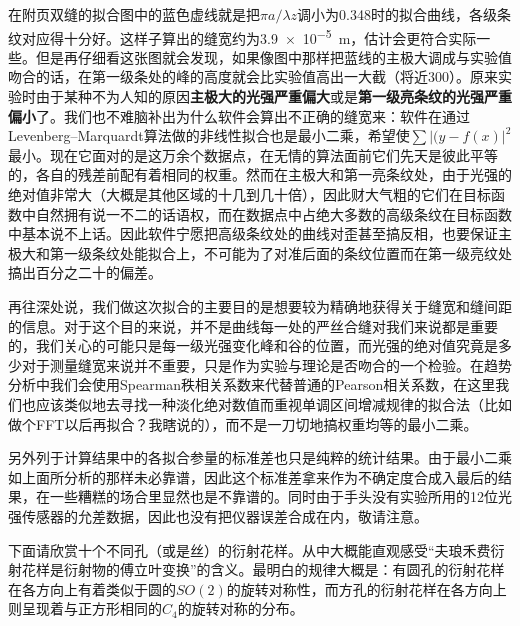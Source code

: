 \documentclass[UTF8]{ctexart}
\begin{document}
在附页双缝的拟合图中的蓝色虚线就是把$\pi a/\lambda z$调小为0.348时的拟合曲线，各级条纹对应得十分好。这样子算出的缝宽约为\SI{3.9e-5}{\m}，估计会更符合实际一些。但是再仔细看这张图就会发现，如果像图中那样把蓝线的主极大调成与实验值吻合的话，在第一级条处的峰的高度就会比实验值高出一大截（将近300）。原来实验时由于某种不为人知的原因\textbf{主极大的光强严重偏大}或是\textbf{第一级亮条纹的光强严重偏小}了。我们也不难脑补出为什么软件会算出不正确的缝宽来：软件在通过Levenberg–Marquardt算法做的非线性拟合也是最小二乘，希望使$\sum\lvert(y-f(x)\rvert^2$最小。现在它面对的是这万余个数据点，在无情的算法面前它们先天是彼此平等的，各自的残差前配有着相同的权重。然而在主极大和第一亮条纹处，由于光强的绝对值非常大（大概是其他区域的十几到几十倍），因此财大气粗的它们在目标函数中自然拥有说一不二的话语权，而在数据点中占绝大多数的高级条纹在目标函数中基本说不上话。因此软件宁愿把高级条纹处的曲线对歪甚至搞反相，也要保证主极大和第一级条纹处能拟合上，不可能为了对准后面的条纹位置而在第一级亮纹处搞出百分之二十的偏差。

再往深处说，我们做这次拟合的主要目的是想要较为精确地获得关于缝宽和缝间距的信息。对于这个目的来说，并不是曲线每一处的严丝合缝对我们来说都是重要的，我们关心的可能只是每一级光强变化峰和谷的位置，而光强的绝对值究竟是多少对于测量缝宽来说并不重要，只是作为实验与理论是否吻合的一个检验。在趋势分析中我们会使用Spearman秩相关系数来代替普通的Pearson相关系数，在这里我们也应该类似地去寻找一种淡化绝对数值而重视单调区间增减规律的拟合法（比如做个FFT以后再拟合？我瞎说的），而不是一刀切地搞权重均等的最小二乘。

另外列于计算结果中的各拟合参量的标准差也只是纯粹的统计结果。由于最小二乘如上面所分析的那样未必靠谱，因此这个标准差拿来作为不确定度合成入最后的结果，在一些糟糕的场合里显然也是不靠谱的。同时由于手头没有实验所用的12位光强传感器的允差数据，因此也没有把仪器误差合成在内，敬请注意。

下面请欣赏十个不同孔（或是丝）的衍射花样。从中大概能直观感受“夫琅禾费衍射花样是衍射物的傅立叶变换”的含义。最明白的规律大概是：有圆孔的衍射花样在各方向上有着类似于圆的$SO(2)$的旋转对称性，而方孔的衍射花样在各方向上则呈现着与正方形相同的$C_4$的旋转对称的分布。
\end{document}
